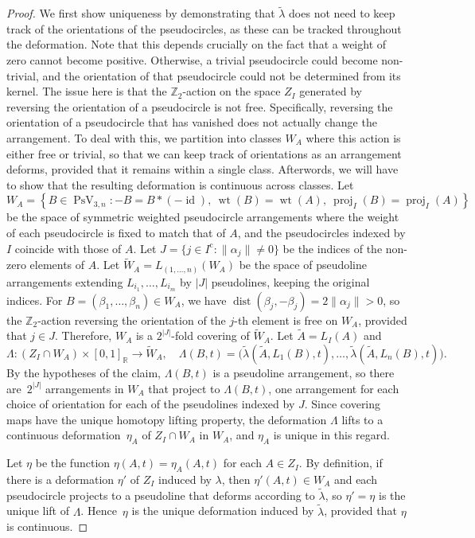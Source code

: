 \documentclass[11pt]{article}
\numberwithin{equation}{section}
\theoremstyle{remark}
\let\mb\mathbb
\newcommand{\compl}[1]{{{#1}^{\text{c}}}}
\DeclareMathOperator{\wei}{wt}
\DeclareMathOperator{\dist}{dist}
\DeclareMathOperator{\pstief}{PsV}
\DeclareMathOperator{\proj}{proj}
\DeclareMathOperator{\id}{id}
\begin{document}
\begin{proof}
We first show uniqueness by demonstrating that $\tilde \lambda$ does not need to keep track of the orientations of the pseudocircles, as these can be tracked throughout the deformation.
Note that this depends crucially on the fact that a weight of zero cannot become positive.
Otherwise, a trivial pseudocircle could become non-trivial, and the orientation of that pseudocircle could not be determined from its kernel. The issue here is that the $\mb{Z}_2$-action on the space $Z_I$ generated by reversing the orientation of a pseudocircle is not free. Specifically, reversing the orientation of a pseudocircle that has vanished does not actually change the arrangement. To deal with this, we partition into classes $W_A$ where this action is either free or trivial, so that we can keep track of orientations as an arrangement deforms, provided that it remains within a single class. Afterwords, we will have to show that the resulting deformation is continuous across classes.
Let
\[ W_A = \left\{B \in \pstief_{3,n}:-B = B*(-\id),\ \wei(B) = \wei(A),\ \proj_I(B) = \proj_I(A) \right\} \]
be the space of symmetric weighted pseudocircle arrangements where the weight of each pseudocircle is fixed to match that of $A$,
and the pseudocircles indexed by $I$ coincide with those of $A$.
Let ${J = \{j \in \compl{I}: \|\alpha_j\| \neq 0 \}}$ be the indices of the non-zero elements of $A$.
Let $\widetilde W_A = L_{(1,\dots,n)}(W_A)$
be the space of pseudoline arrangements extending $L_{i_1},\dots,L_{i_m}$ by $|J|$ pseudolines, keeping the original indices.
For $B = (\beta_1,\dots,\beta_n) \in W_A$, we have $\dist(\beta_j,- \beta_j) = 2\|\alpha_j\| >0$, so the $\mb{Z}_2$-action reversing the orientation of the $j$-th element is free on $W_A$, provided that $j \in J$.
Therefore, $W_A$ is a $2^{|J|}$-fold covering of $\widetilde W_A$.
Let $\tilde A = L_I(A)$ and
\[
\Lambda : (Z_I\cap W_A) \times [0,1]_\mb{R} \to \widetilde W_A, \quad
\Lambda(B,t) = \bigl( \tilde \lambda(\tilde A, L_1(B), t),\dots, \tilde \lambda(\tilde A, L_n(B),t) \bigr).
\]
By the hypotheses of the claim, $\Lambda(B,t)$ is a pseudoline arrangement, so there are~$2^{|J|}$ arrangements in $W_A$ that project to $\Lambda(B,t)$, one arrangement for each choice of orientation for each of the pseudolines indexed by $J$.
Since covering maps have the unique homotopy lifting property, the deformation $\Lambda$ lifts to a continuous deformation~$\eta_A$ of $Z_I \cap W_A$ in $W_A$, and $\eta_A$ is unique in this regard.

Let $\eta$ be the function $\eta(A,t) = \eta_A(A,t)$ for each $A \in Z_I$.
By definition, if there is a deformation $\eta'$ of $Z_I$ induced by $\lambda$, then $\eta'(A,t) \in W_A$ and each pseudocircle projects to a pseudoline that deforms according to $\tilde \lambda$, so $\eta' = \eta$ is the unique lift of $\Lambda$.
Hence~$\eta$ is the unique deformation induced by $\tilde \lambda$, provided that $\eta$ is continuous.


\end{proof}
\end{document}
